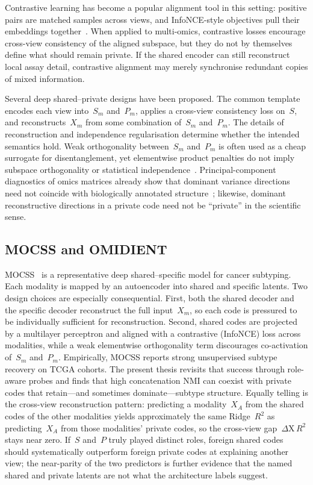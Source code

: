 Contrastive learning has become a popular alignment tool in this setting: positive pairs are matched samples across views, and InfoNCE-style objectives pull their embeddings together~\citep{chen2020simple}. When applied to multi-omics, contrastive losses encourage cross-view consistency of the aligned subspace, but they do not by themselves define what should remain private. If the shared encoder can still reconstruct local assay detail, contrastive alignment may merely synchronise redundant copies of mixed information.

Several deep shared--private designs have been proposed. The common template encodes each view into~$S_m$ and~$P_m$, applies a cross-view consistency loss on~$S$, and reconstructs~$X_m$ from some combination of~$S_m$ and~$P_m$. The details of reconstruction and independence regularisation determine whether the intended semantics hold. Weak orthogonality between~$S_m$ and~$P_m$ is often used as a cheap surrogate for disentanglement, yet elementwise product penalties do not imply subspace orthogonality or statistical independence~\citep{zbontar2021barlow,bardes2022vicreg}. Principal-component diagnostics of omics matrices already show that dominant variance directions need not coincide with biologically annotated structure~\citep{yeung2001principal}; likewise, dominant reconstructive directions in a private code need not be ``private'' in the scientific sense.

\subsection{MOCSS and OMIDIENT}

MOCSS~\citep{chen2023mocss} is a representative deep shared--specific model for cancer subtyping. Each modality is mapped by an autoencoder into shared and specific latents. Two design choices are especially consequential. First, both the shared decoder and the specific decoder reconstruct the full input~$X_m$, so each code is pressured to be individually sufficient for reconstruction. Second, shared codes are projected by a multilayer perceptron and aligned with a contrastive (InfoNCE) loss across modalities, while a weak elementwise orthogonality term discourages co-activation of~$S_m$ and~$P_m$. Empirically, MOCSS reports strong unsupervised subtype recovery on TCGA cohorts. The present thesis revisits that success through role-aware probes and finds that high concatenation NMI can coexist with private codes that retain---and sometimes dominate---subtype structure. Equally telling is the cross-view reconstruction pattern: predicting a modality~$X_A$ from the shared codes of the other modalities yields approximately the same Ridge~$R^{2}$ as predicting~$X_A$ from those modalities' private codes, so the cross-view gap~$\Delta\mathrm{X}\,R^{2}$ stays near zero. If~$S$ and~$P$ truly played distinct roles, foreign shared codes should systematically outperform foreign private codes at explaining another view; the near-parity of the two predictors is further evidence that the named shared and private latents are not what the architecture labels suggest.

